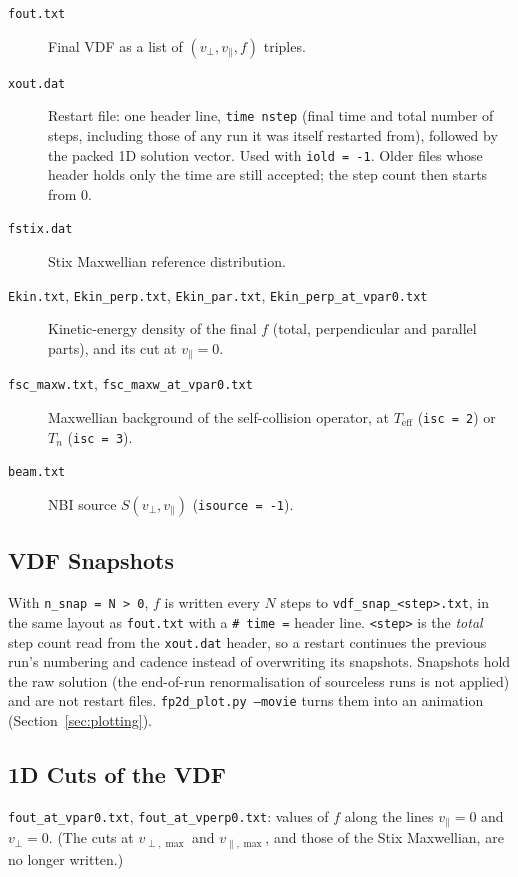 \documentclass[11pt,a4paper]{article}
\newcommand{\vp}{v_\perp}
\newcommand{\vpa}{v_\parallel}
\newcommand{\vpmax}{v_{\perp,\max}}
\newcommand{\vpamax}{v_{\parallel,\max}}
\begin{document}
\begin{description}
  \item[\texttt{fout.txt}] Final VDF as a list of $(\vp, \vpa, f)$ triples.
  \item[\texttt{xout.dat}] Restart file: one header line, \texttt{time nstep}
        (final time and total number of steps, including those of any run it
        was itself restarted from), followed by the packed 1D solution vector.
        Used with \texttt{iold = -1}.  Older files whose header holds only the
        time are still accepted; the step count then starts from 0.
  \item[\texttt{fstix.dat}] Stix Maxwellian reference distribution.
  \item[\texttt{Ekin.txt}, \texttt{Ekin\_perp.txt}, \texttt{Ekin\_par.txt},
        \texttt{Ekin\_perp\_at\_vpar0.txt}] Kinetic-energy density of the final
        $f$ (total, perpendicular and parallel parts), and its cut at
        $\vpa = 0$.
  \item[\texttt{fsc\_maxw.txt}, \texttt{fsc\_maxw\_at\_vpar0.txt}] Maxwellian
        background of the self-collision operator, at $T_\mathrm{eff}$
        (\texttt{isc = 2}) or $T_n$ (\texttt{isc = 3}).
  \item[\texttt{beam.txt}] NBI source $S(\vp,\vpa)$ (\texttt{isource = -1}).
\end{description}

\subsection{VDF Snapshots}
\label{sec:snap}

With \texttt{n\_snap = N > 0}, $f$ is written every $N$ steps to
\texttt{vdf\_snap\_<step>.txt}, in the same layout as \texttt{fout.txt} with a
\texttt{\# time =} header line.  \texttt{<step>} is the \emph{total} step count
read from the \texttt{xout.dat} header, so a restart continues the previous
run's numbering and cadence instead of overwriting its snapshots.  Snapshots
hold the raw solution (the end-of-run renormalisation of sourceless runs is not
applied) and are not restart files.  \texttt{fp2d\_plot.py --movie} turns them
into an animation (Section~\ref{sec:plotting}).

\subsection{1D Cuts of the VDF}

\texttt{fout\_at\_vpar0.txt}, \texttt{fout\_at\_vperp0.txt}: values of $f$
along the lines $\vpa = 0$ and $\vp = 0$.  (The cuts at $\vpmax$ and $\vpamax$,
and those of the Stix Maxwellian, are no longer written.)
\end{document}
